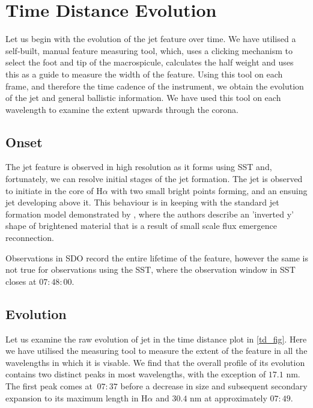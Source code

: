 \documentclass{emulateapj}
\begin{document}
\section{Time Distance Evolution}
\label{time_dist_sect}


Let us begin with the evolution of the jet feature over time. 
We have utilised a self-built, manual feature measuring tool, which, uses a clicking mechanism to select the foot and tip of the macrospicule, calculates the half weight and uses this as a guide to measure the width of the feature.
Using this tool on each frame, and therefore the time cadence of the instrument, we obtain the evolution of the jet and general ballistic information.
We have used this tool on each wavelength to examine the extent upwards through the corona. 

\subsection{Onset}
The jet feature is observed in high resolution as it forms using SST and, fortunately, we can resolve initial stages of the jet formation.
The jet is observed to initiate in the core of H$\alpha$ with two small bright points forming, and an ensuing jet developing above it. 
This behaviour is in keeping with the standard jet formation model demonstrated by \cite{Shibata1992}, where the authors describe an 'inverted y' shape of brightened material that is a result of small scale flux emergence reconnection.

Observations in SDO record the entire lifetime of the feature, however the same is not true for observations using the SST, where the observation window in SST closes at $07:48:00$.



\subsection{Evolution}
Let us examine the raw evolution of jet in the time distance plot in \ref{td_fig}.
Here we have utilised the measuring tool to measure the extent of the feature in all the wavelengths in which it is visable.
We find that the overall profile of its evolution contains two distinct peaks in most wavelengths, with the exception of $17.1$ nm.
The first peak comes at $~07:37$ before a decrease in size and subsequent secondary expansion to its maximum length in H$\alpha$ and $30.4$ nm at approximately $07:49$.
\end{document}
